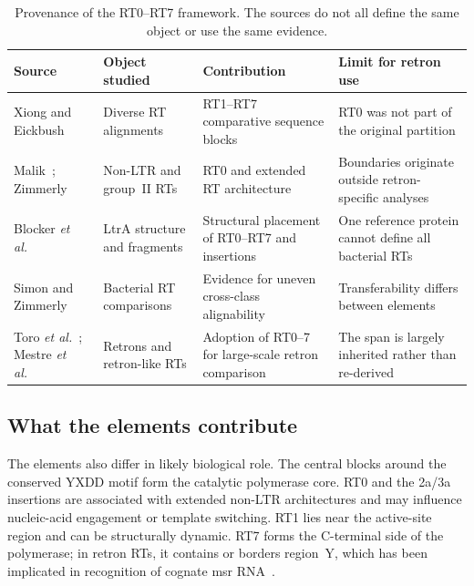 \begin{table}[ht]
\centering
\small
\setlength{\tabcolsep}{4pt}
\begin{tabularx}{\textwidth}{@{}p{2.6cm}p{3.2cm}X p{3.0cm}@{}}
\toprule
\textbf{Source} & \textbf{Object studied} & \textbf{Contribution} & \textbf{Limit for retron use}\\
\midrule
Xiong and Eickbush~\cite{xiong1990} & Diverse RT alignments & RT1--RT7 comparative sequence blocks & RT0 was not part of the original partition\\
Malik~\cite{malik1999}; Zimmerly~\cite{zimmerly2001} & Non-LTR and group~II RTs & RT0 and extended RT architecture & Boundaries originate outside retron-specific analyses\\
Blocker \textit{et al.}~\cite{blocker2005} & LtrA structure and fragments & Structural placement of RT0--RT7 and insertions & One reference protein cannot define all bacterial RTs\\
Simon and Zimmerly~\cite{simon2008} & Bacterial RT comparisons & Evidence for uneven cross-class alignability & Transferability differs between elements\\
Toro \textit{et al.}~\cite{toro2019}; Mestre \textit{et al.}~\cite{mestre2020} & Retrons and retron-like RTs & Adoption of RT0--7 for large-scale retron comparison & The span is largely inherited rather than re-derived\\
\bottomrule
\end{tabularx}
\caption[Provenance of the RT0--RT7 framework]{Provenance of the RT0--RT7 framework. The sources do not all define the same object or use the same evidence.}
\label{tab:rt-sources-revised}
\end{table}

\subsection{What the elements contribute}

The elements also differ in likely biological role. The central blocks around
the conserved YXDD motif form the catalytic polymerase core. RT0 and the
2a/3a insertions are associated with extended non-LTR architectures and may
influence nucleic-acid engagement or template switching. RT1 lies near the
active-site region and can be structurally dynamic. RT7 forms the C-terminal
side of the polymerase; in retron RTs, it contains or borders region~Y, which
has been implicated in recognition of cognate msr RNA~\cite{inouye1999,mestre2020}.

